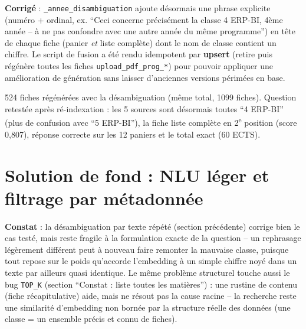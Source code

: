 \documentclass[11pt,a4paper]{report}
\begin{document}
\textbf{Corrigé} : \texttt{\_annee\_disambiguation} ajoute désormais une phrase
explicite (numéro + ordinal, ex. ``Ceci concerne précisément la classe 4 ERP-BI,
4ème année -- à ne pas confondre avec une autre année du même programme'') en tête
de chaque fiche (panier \emph{et} liste complète) dont le nom de classe contient un
chiffre. Le script de fusion a été rendu idempotent par \textbf{upsert} (retire puis
régénère toutes les fiches \texttt{upload\_pdf\_prog\_*}) pour pouvoir appliquer une
amélioration de génération sans laisser d'anciennes versions périmées en base.

\begin{statutfait}
524 fiches régénérées avec la désambiguation (même total, 1099 fiches). Question
retestée après ré-indexation : les 5 sources sont désormais toutes ``4 ERP-BI''
(plus de confusion avec ``5 ERP-BI''), la fiche liste complète en 2\textsuperscript{e}
position (score 0{,}807), réponse correcte sur les 12 paniers et le total exact
(60 ECTS).
\end{statutfait}

\section{Solution de fond : NLU léger et filtrage par métadonnée}

\textbf{Constat} : la désambiguation par texte répété (section précédente) corrige
bien le cas testé, mais reste fragile à la formulation exacte de la question --
un rephrasage légèrement différent peut à nouveau faire remonter la mauvaise
classe, puisque tout repose sur le poids qu'accorde l'embedding à un simple
chiffre noyé dans un texte par ailleurs quasi identique. Le même problème
structurel touche aussi le bug \texttt{TOP\_K} (section ``Constat : liste
toutes les matières'') : une rustine de contenu (fiche récapitulative) aide,
mais ne résout pas la cause racine -- la recherche reste une similarité
d'embedding non bornée par la structure réelle des données (une classe = un
ensemble précis et connu de fiches).
\end{document}
